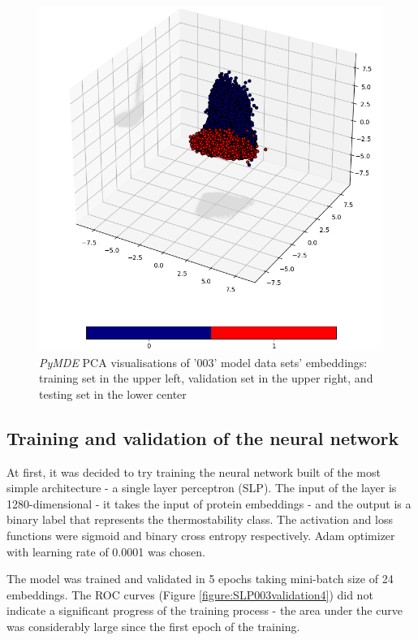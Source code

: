 \documentclass[12pt]{article}
\begin{document}
\begin{figure}[h!]
		\includegraphics[scale=0.4]{003_test_v2_MDE_PCA.png}

		\caption{\textit{PyMDE} PCA visualisations of '003' model data sets' embeddings: training set
				in the upper left, validation set in the upper right, and 
				testing set in the lower center}
		\label{figure:PyMDEPCAembeddings003}
	\end{figure}

	\newpage

	\subsection{Training and validation of the neural network}

	At first, it was decided to try training the neural network built of
	the most simple architecture - a single layer perceptron (SLP). The input of the 
	layer is 1280-dimensional - it takes the input of protein embeddings - and the 
	output is a binary label that represents the thermostability class. The 
	activation and loss functions were sigmoid and binary cross
	entropy respectively. Adam optimizer with learning rate of 0.0001 was chosen.

	The model was trained and validated in 5 epochs taking mini-batch size of 24
	embeddings. The ROC curves (Figure \ref{figure:SLP003validation4}) did not 
	indicate a significant progress of the training process - the area under 
	the curve was considerably large since the
	first epoch of the training.
\end{document}
